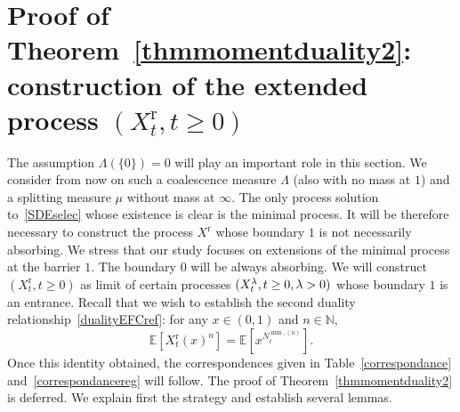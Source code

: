 \documentclass[10pt]{amsart}
\theoremstyle{definition}\newtheorem{defi}[theo]{Definition}\newtheorem{rema}[theo]{Remark}\newtheorem{exam}[theo]{Example}\newtheorem{exem}[theo]{Example}\newtheorem{nota}[theo]{Notation}
\newcommand{\rmr}{\mathrm{r}}
\newcommand{\bbN}{\mathbb{N}}
\newcommand{\bbE}{\mathbb{E}}
\begin{document}
\section{Proof of Theorem~\ref{thmmomentduality2}: construction of the extended process \texorpdfstring{$(X^{\rmr}_t,t\geq 0)$}{(Xrt,t>= 0)}}\label{sec2}
The assumption $\Lambda(\{0\})=0$ will play an important role in this section. We consider from now on such a coalescence measure $\Lambda$ (also with no mass at $1$) and a splitting measure $\mu$ without mass at $\infty$. The only process solution to~\eqref{SDEselec} whose existence is clear is the minimal process. It will be therefore necessary to construct the process $X^{\rmr}$ whose boundary $1$ is not necessarily absorbing. We stress that our study focuses on extensions of the minimal process at the barrier $1$. The boundary $0$ will be always absorbing. We will construct $(X_t^{\rmr}, t\geq 0)$ as limit of certain processes $(X_t^{\lambda},t\geq 0,\lambda\linebreak>0)$ whose boundary $1$ is an entrance. Recall that we wish to establish the second duality relationship~\eqref{dualityEFCref}: for any $x\in (0,1)$ and $n\in \bbN$,
\[
\bbE\left[X_t^{\rmr}(x)^n\right]=\bbE\left[x^{N_t^{\min,(n)}}\right].
\]
Once this identity obtained, the correspondences given in Table~\ref{correspondance} and~\ref{correspondancereg} will follow. The proof of Theorem~\ref{thmmomentduality2} is deferred. We explain first the strategy and establish several lemmas.
\end{document}
